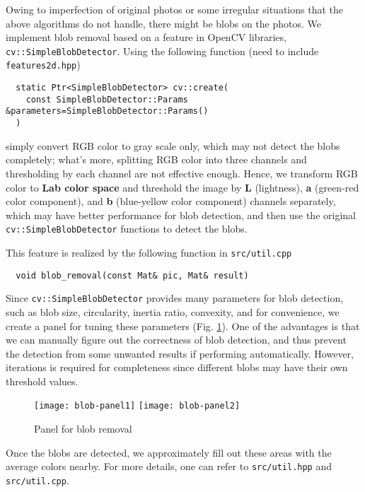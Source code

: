 Owing to imperfection of original photos or some irregular situations that the above algorithms do not handle, there might be blobs on the photos. We implement blob removal based on a feature in OpenCV libraries, \texttt{cv::SimpleBlobDetector}. Using the following function (need to include \texttt{features2d.hpp})
\begin{lstlisting}
  static Ptr<SimpleBlobDetector> cv::create(
    const SimpleBlobDetector::Params &parameters=SimpleBlobDetector::Params()
  )
\end{lstlisting}
simply convert RGB color to gray scale only, which may not detect the blobs completely; what's more, splitting RGB color into three channels and thresholding by each channel are not effective enough. Hence, we transform RGB color to \textbf{Lab color space} and threshold the image by \textbf{L} (lightness), \textbf{a} (green-red color component), and \textbf{b} (blue-yellow color component) channels separately, which may have better performance for blob detection, and then use the original \texttt{cv::SimpleBlobDetector} functions to detect the blobs.

This feature is realized by the following function in \texttt{src/util.cpp}
\begin{lstlisting}
  void blob_removal(const Mat& pic, Mat& result)
\end{lstlisting}
Since \texttt{cv::SimpleBlobDetector} provides many parameters for blob detection, such as blob size, circularity, inertia ratio, convexity, and for convenience, we create a panel for tuning these parameters (Fig. \ref{fig:blob-panel}). One of the advantages is that we can manually figure out the correctness of blob detection, and thus prevent the detection from some unwanted results if performing automatically. However, iterations is required for completeness since different blobs may have their own threshold values.

\begin{figure}[!ht]
  \centering
  \texttt{[image: blob-panel1]}
  \texttt{[image: blob-panel2]}
  \caption{Panel for blob removal}
  \label{fig:blob-panel}
\end{figure}

Once the blobs are detected, we approximately fill out these areas with the average colors nearby. For more details, one can refer to \texttt{src/util.hpp} and \texttt{src/util.cpp}. 